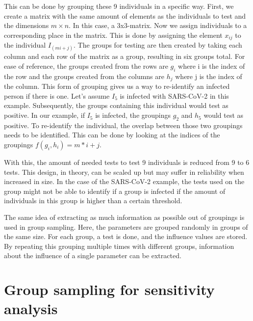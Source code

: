 \documentclass[../../thesis.tex]{subfiles}
\begin{document}
This can be done by grouping these 9 individuals in a specific way.
First, we create a matrix with the same amount of elements as the individuals to test and the dimensions $ m\times n$.
In this case, a 3x3-matrix. Now we assign individuals to a corresponding place in the matrix.
This is done by assigning the element $x_{ij}$ to the individual $I_{(mi+j)}$.
The groups for testing are then created by taking each column and each row of the matrix as a group, resulting in six groups total.
For ease of reference, the groups created from the rows are $g_i$ where i is the index of the row and
the groups created from the columns are $h_j$ where j is the index of the column.
This form of grouping gives us a way to re-identify an infected person if there is one.
Let's assume $I_5$ is infected with SARS-CoV-2 in this example.
Subsequently, the groups containing this individual would test as positive. In our example, if $I_5$ is infected,
the groupings $g_2$ and $h_5$ would test as positive. To re-identify the individual, the overlap between those two groupings needs to be identified.
This can be done by looking at the indices of the groupings $ f(g_i, h_i) = m * i + j $.

With this, the amount of needed tests to test 9 individuals is reduced from 9 to 6 tests. This design, in theory, can be scaled up but may
suffer in reliability when increased in size. In the case of the SARS-CoV-2 example, the tests used on the group might not be able to identify
if a group is infected if the amount of individuals in this group is higher than a certain threshold.

The same idea of extracting as much information as possible out of groupings is used in group sampling. Here, the parameters are grouped
randomly in groups of the same size. For each group, a test is done, and the influence values are stored. By repeating this grouping
multiple times with different groups, information about the influence of a single parameter can be extracted.


\section{Group sampling for sensitivity analysis}
\end{document}
